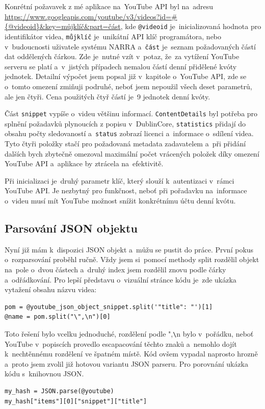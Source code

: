 \par Konrétní požavavek z mé aplikace na~YouTube API byl na~adresu \url{https://www.googleapis.com/youtube/v3/videos?id=#{@videoid}&key=můjklíč}\hfill \break \url{&part=část}\cite{apiurl}, kde \texttt{@videoid} je~inicializovaná hodnota pro identifikátor videa, \texttt{můjklíč} je~unikátní API klíč programátora, nebo v~budoucnosti uživatele systému NARRA a~\texttt{část} je~seznam požadovaných částí dat oddělených čárkou. Zde je~nutné vzít v~potaz, že~za vytížení YouTube serveru se platí a~v~jistých případech nemalou částí denní přidělené kvóty\cite{googleconsole1} jednotek. Detailní výpočet jsem popsal již v~kapitole o~YouTube API, zde se o~tomto omezení zmiňuji podruhé, neboť jsem nepoužil všech deset parametrů, ale jen čtyři. Cena použitých čtyř částí je~9 jednotek denní kvóty.
\par Část \texttt{snippet} vypíše o~videu většinu informací. \texttt{ContentDetails} byl potřeba pro splnění požadavků plynoucích z popisu v~DublinCore, \texttt{statistics} přidají do obsahu počty sledovaností a~\texttt{status} zobrazí licenci a~informace o~sdílení videa. Tyto čtyři položky stačí pro požadovaná metadata zadavatelem a~při přidání dalších bych zbytečně omezoval maximální počet vrácených položek díky omezení YouTube API a~aplikace by ztrácela na~efektivitě.
\par Při inicializaci je~druhý parametr klíč, který slouží k~autentizaci v~rámci YouTube API. Je nezbytný pro funkčnost, neboť při pořadavku na~informace o~videu musí mít YouTube možnost snížit konkrétnímu účtu denní kvótu.

\subsection{Parsování JSON objektu}
\par Nyní již mám k~dispozici JSON objekt a~můžu se pustit do práce. První pokus o~rozparsování proběhl ručně. Vždy jsem si~pomocí methody split rozdělil objekt na~pole o~dvou částech a~druhý index jsem rozdělil znovu podle čárky a~odřádkování. Pro lepší představu o~vizuální stránce kódu je~zde ukázka vytažení obsahu názvu videa:
\begin{verbatim}
pom = @youtube_json_object_snippet.split('"title": "')[1]
@name = pom.split("\",\n")[0]
\end{verbatim}
\par Toto řešení bylo vcelku jednoduché, rozdělení podle ",\verb|\|n bylo v~pořádku, neboť YouTube v~popiscích provedlo escapacování těchto znaků a~nemohlo dojít k~nechtěnnému rozdělení ve špatném místě. Kód ovšem vypadal naprosto hrozně a~proto jsem zvolil již hotovou variantu JSON parseru. Pro porovnání ukázka kódu s~knihovnou JSON.
\begin{verbatim}
my_hash = JSON.parse(@youtube)
my_hash["items"][0]["snippet"]["title"]
\end{verbatim}

